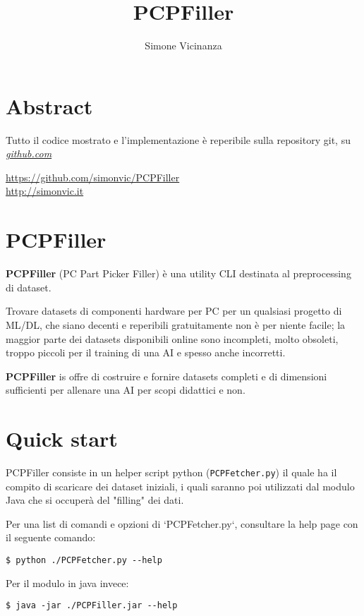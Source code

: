 \documentclass[12pt]{report}
\title{PCPFiller}
\author{Simone Vicinanza}
\date{}
\begin{document}
\maketitle

\section*{Abstract}
Tutto il codice mostrato e l'implementazione è reperibile sulla repository git, su \textit{\underline{github.com}}
\begin{center}
\url{https://github.com/simonvic/PCPFiller}\\
\url{http://simonvic.it}
\end{center}

\newpage
\lstlistoflistings 
\tableofcontents

\newpage
\section{PCPFiller}

\textbf{PCPFiller} (PC Part Picker Filler) è una utility CLI destinata al
preprocessing di dataset.

Trovare datasets di componenti hardware per PC per un qualsiasi progetto di ML/DL, che siano
decenti e reperibili gratuitamente non è per niente facile; la maggior parte dei datasets
disponibili online sono incompleti, molto obsoleti, troppo piccoli per il training di una AI e
spesso anche incorretti.

\textbf{PCPFiller} is offre di costruire e fornire datasets completi e di dimensioni sufficienti per allenare
una AI per scopi didattici e non.

\section{Quick start}

PCPFiller consiste in un helper script python (\texttt{PCPFetcher.py}) il quale ha il compito di
scaricare dei dataset iniziali, i quali saranno poi utilizzati dal modulo Java che si occuperà del
"filling" dei dati.

Per una list di comandi e opzioni di `PCPFetcher.py`, consultare la help page con il seguente comando:
\begin{lstlisting}
$ python ./PCPFetcher.py --help
\end{lstlisting}

Per il modulo in java invece:
\begin{lstlisting}
$ java -jar ./PCPFiller.jar --help
\end{lstlisting}
\end{document}
